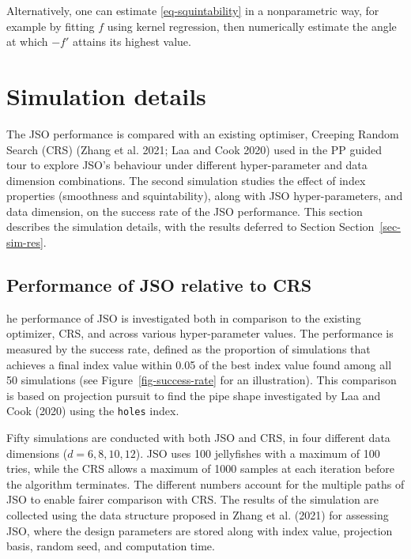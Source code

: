 \documentclass[
  12pt,
]{interact}
\theoremstyle{plain}
\begin{document}
Alternatively, one can estimate \eqref{eq-squintability} in a
nonparametric way, for example by fitting \(f\) using kernel regression,
then numerically estimate the angle at which \(-f'\) attains its highest
value.

\hypertarget{sec-sim-deets}{%
\section{Simulation details}\label{sec-sim-deets}}

The JSO performance is compared with an existing optimiser, Creeping
Random Search (CRS) (Zhang et al. 2021; Laa and Cook 2020) used in the
PP guided tour to explore JSO's behaviour under different
hyper-parameter and data dimension combinations. The second simulation
studies the effect of index properties (smoothness and squintability),
along with JSO hyper-parameters, and data dimension, on the success rate
of the JSO performance. This section describes the simulation details,
with the results deferred to Section Section~\ref{sec-sim-res}.

\hypertarget{sec-app-1}{%
\subsection{Performance of JSO relative to CRS}\label{sec-app-1}}

he performance of JSO is investigated both in comparison to the existing
optimizer, CRS, and across various hyper-parameter values. The
performance is measured by the success rate, defined as the proportion
of simulations that achieves a final index value within 0.05 of the best
index value found among all 50 simulations (see
Figure~\ref{fig-success-rate} for an illustration). This comparison is
based on projection pursuit to find the pipe shape investigated by Laa
and Cook (2020) using the \texttt{holes} index.

Fifty simulations are conducted with both JSO and CRS, in four different
data dimensions (\(d = 6, 8, 10, 12\)). JSO uses 100 jellyfishes with a
maximum of 100 tries, while the CRS allows a maximum of 1000 samples at
each iteration before the algorithm terminates. The different numbers
account for the multiple paths of JSO to enable fairer comparison with
CRS. The results of the simulation are collected using the data
structure proposed in Zhang et al. (2021) for assessing JSO, where the
design parameters are stored along with index value, projection basis,
random seed, and computation time.
\end{document}
